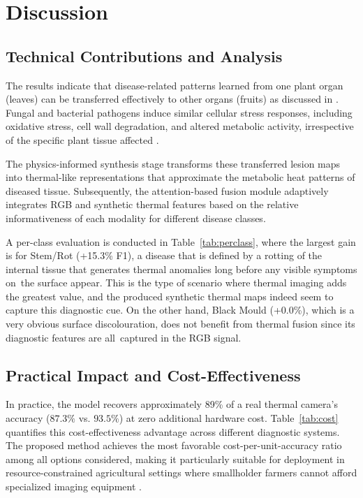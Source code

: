 \documentclass[utf8]{FrontiersinHarvard} %
\begin{document}
\section{Discussion}

\subsection{Technical Contributions and Analysis}
The results indicate that disease-related patterns learned from one plant organ (leaves) can be transferred effectively  to other organs (fruits) as discussed in \cite{hassan2021,bock2010}. Fungal and bacterial pathogens induce similar cellular stress responses, including oxidative stress, cell wall degradation, and altered metabolic activity, irrespective of the specific plant tissue affected \cite{savary2019}.

The physics-informed synthesis stage \cite{raissi2019,karniadakis2021} transforms these transferred lesion maps into thermal-like representations that approximate the metabolic heat patterns of diseased tissue. Subsequently, the attention-based fusion module \cite{vaswani2017,guo2022} adaptively integrates RGB and synthetic thermal features based on the relative informativeness of each modality for different disease classes.

A per-class evaluation is conducted in Table~\ref{tab:perclass}, where the largest gain is for Stem/Rot (+15.3\% F1), a disease that is defined by a rotting of the internal tissue that generates thermal anomalies long before any visible symptoms on the surface appear. This is the type of scenario where thermal imaging adds the greatest value, and the produced synthetic thermal maps indeed seem to capture this diagnostic cue. On the other hand, Black Mould (+0.0\%), which is a very obvious surface discolouration, does not benefit from thermal fusion since its diagnostic features are all captured in the RGB signal.

\subsection{Practical Impact and Cost-Effectiveness}
In practice, the model recovers approximately 89\% of a real thermal camera's accuracy ($87.3\%$ vs. $93.5\%$) at zero additional hardware cost. Table~\ref{tab:cost} quantifies this cost-effectiveness advantage across different diagnostic systems. The proposed method achieves the most favorable cost-per-unit-accuracy ratio among all options considered, making it particularly suitable for deployment in resource-constrained agricultural settings where smallholder farmers cannot afford specialized imaging equipment \cite{temniranrat2021,benos2021}.
\end{document}
